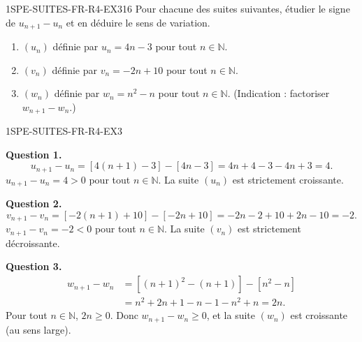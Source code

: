 
\begin{exercice}{1SPE-SUITES-FR-R4-EX3}{1}{6}
Pour chacune des suites suivantes, étudier le signe de $u_{n+1} - u_n$ et en déduire le sens de variation.
\begin{enumerate}
  \item $(u_n)$ définie par $u_n = 4n - 3$ pour tout $n \in \mathbb{N}$.
  \item $(v_n)$ définie par $v_n = -2n + 10$ pour tout $n \in \mathbb{N}$.
  \item $(w_n)$ définie par $w_n = n^2 - n$ pour tout $n \in \mathbb{N}$. (Indication : factoriser $w_{n+1} - w_n$.)
\end{enumerate}
\end{exercice}


\begin{corrige}{1SPE-SUITES-FR-R4-EX3}


\textbf{Question 1.}
\[
u_{n+1} - u_n = [4(n+1) - 3] - [4n - 3] = 4n + 4 - 3 - 4n + 3 = 4.
\]
$u_{n+1} - u_n = 4 > 0$ pour tout $n \in \mathbb{N}$. La suite $(u_n)$ est strictement croissante.

\textbf{Question 2.}
\[
v_{n+1} - v_n = [-2(n+1) + 10] - [-2n + 10] = -2n - 2 + 10 + 2n - 10 = -2.
\]
$v_{n+1} - v_n = -2 < 0$ pour tout $n \in \mathbb{N}$. La suite $(v_n)$ est strictement décroissante.


\textbf{Question 3.}
\begin{align*}
w_{n+1} - w_n &= [(n+1)^2 - (n+1)] - [n^2 - n] \\
               &= n^2 + 2n + 1 - n - 1 - n^2 + n = 2n.
\end{align*}
Pour tout $n \in \mathbb{N}$, $2n \geq 0$. Donc $w_{n+1} - w_n \geq 0$, et la suite $(w_n)$ est croissante (au sens large).

\end{corrige}

